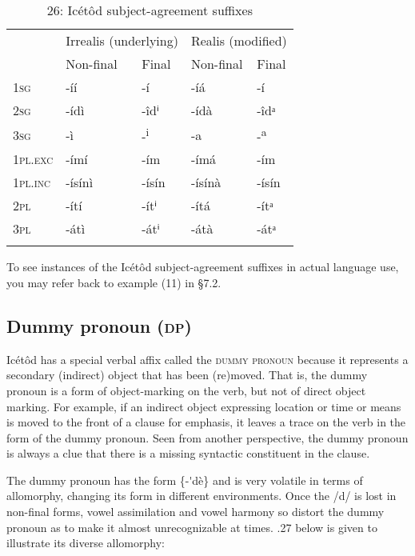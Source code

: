 \begin{table}
\begin{table}
\caption{26: Icétôd subject-agreement suffixes}
\label{tab:8}


\begin{tabularx}{\textwidth}{XXXXX} & \multicolumn{2}{X}{Irrealis (underlying)} & \multicolumn{2}{X}{Realis (modified)}\\
\lsptoprule
& Non-final & Final & Non-final & Final\\
\textsc{1sg} & {}-íí & {}-í & {}-íá & {}-í\\
\textsc{2sg} & {}-ídì & {}-îdⁱ & {}-ídà & {}-îdᵃ\\
\textsc{3sg} & {}-ì & {}-\textsuperscript{i} & {}-a & {}-\textsuperscript{a}\\
\textsc{1pl.exc} & {}-ímí & {}-ím & {}-ímá & {}-ím\\
\textsc{1pl.inc} & {}-ísínì & {}-ísín & {}-ísínà & {}-ísín\\
\textsc{2pl} & {}-ítí & {}-ítⁱ & {}-ítá & {}-ítᵃ\\
\textsc{3pl} & {}-átì & {}-átⁱ & {}-átà & {}-átᵃ\\
\lspbottomrule
\end{tabularx}
\end{table}
To see instances of the Icétôd subject-agreement suffixes in actual language use, you may refer back to example (11) in §7.2.




\subsection{Dummy pronoun (\textsc{dp})}


Icétôd has a special verbal affix called the \textsc{dummy pronoun} because it represents a secondary (indirect) object that has been (re)moved. That is, the dummy pronoun is a form of object-marking on the verb, but not of direct object marking. For example, if an indirect object expressing location or time or means is moved to the front of a clause for emphasis, it leaves a trace on the verb in the form of the dummy pronoun. Seen from another perspective, the dummy pronoun is always a clue that there is a missing syntactic constituent in the clause.

The dummy pronoun has the form \{-\'{ }dè\} and is very volatile in terms of allomorphy, changing its form in different environments. Once the /d/ is lost in non-final forms, vowel assimilation and vowel harmony so distort the dummy pronoun as to make it almost unrecognizable at times. .27 below is given to illustrate its diverse allomorphy:



\end{table}

